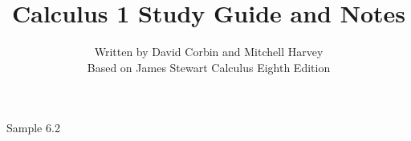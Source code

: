\documentclass{article}
\begin{document}
\title{Calculus 1 Study Guide and Notes}
\date{}
\author{Written by David Corbin and Mitchell Harvey\\ \small{Based on James Stewart Calculus Eighth Edition}}
\maketitle

Sample 6.2
\end{document}
